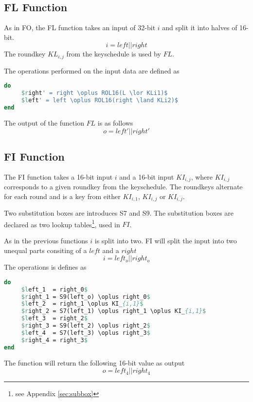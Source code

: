 \subsection{FL Function}
As in FO, the FL function takes an input of 32-bit $i$ and split it into
halves of 16-bit.
\[i = left || right\]
The roundkey $KL_{i,j}$ from the keyschedule is used by $FL$.

The operations performed on the input data are defined as
\begin{lstlisting}[frame=single, language=Pascal, mathescape,captionpos=b, caption={Pseudo code for $FL$ function}]
do
     $right' = right \oplus ROL16(L \lor KLi1)$
     $left' = left \oplus ROL16(right \land KLi2)$
end
\end{lstlisting}
The output of the function $FL$ is as follows
\[o = left' || right'\]
\subsection{FI Function}
The FI function takes a 16-bit input $i$ and a 16-bit input $KI_{i,j}$,
where $KI_{i,j}$ corresponds to a given roundkey from the keyschedule. The
roundkeys alternate for each round and is a key from either $KI_{i,1}$, $KI_{i,j}$
or $KI_{i,j}$.

Two substitution boxes are introduces S7 and S9. The substitution
boxes are declared as two lookup tables\footnote{see Appendix
  \ref{sec:subbox}}, used in $FI$.

As in the previous functions $i$ is split into two. FI will split the
input into two unequal parts consiting of a  $left$ and a
 $right$
\[ i = left_o || right_o \]
The operations is defines as
\begin{lstlisting}[frame=single, language=Pascal, mathescape,
captionpos=b, caption={Pseudo code for $FI$ function}]
do
     $left_1  = right_0$
     $right_1 = S9(left_o) \oplus right_0$
     $left_2  = right_1 \oplus KI_{i,1}$
     $right_2 = S7(left_1) \oplus right_1 \oplus KI_{i,1}$
     $left_3  = right_2$
     $right_3 = S9(left_2) \oplus right_2$
     $left_4  = S7(left_3) \oplus right_3$
     $right_4 = right_3$
end
\end{lstlisting}
The function will return the following 16-bit value as output
\[o = left_4 || right_4\]

